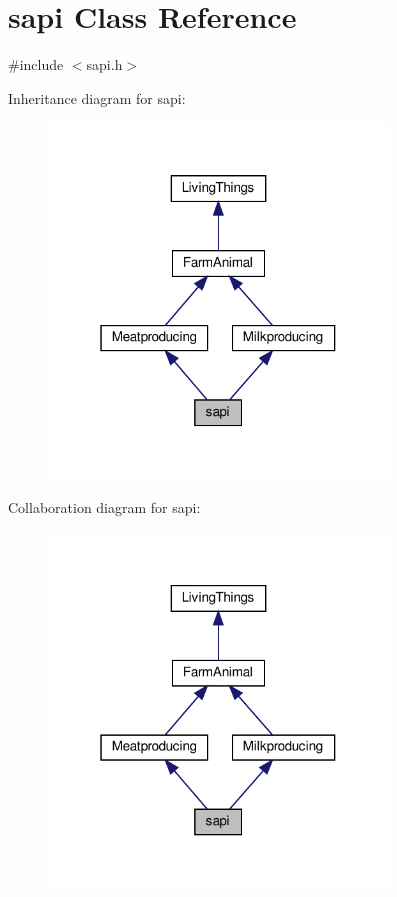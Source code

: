 \hypertarget{classsapi}{}\section{sapi Class Reference}
\label{classsapi}


{\ttfamily \#include $<$sapi.\+h$>$}



Inheritance diagram for sapi\+:
\nopagebreak
\begin{figure}[H]
\begin{center}
\leavevmode
\includegraphics[width=256pt]{classsapi__inherit__graph}
\end{center}
\end{figure}


Collaboration diagram for sapi\+:
\nopagebreak
\begin{figure}[H]
\begin{center}
\leavevmode
\includegraphics[width=256pt]{classsapi__coll__graph}
\end{center}
\end{figure}
